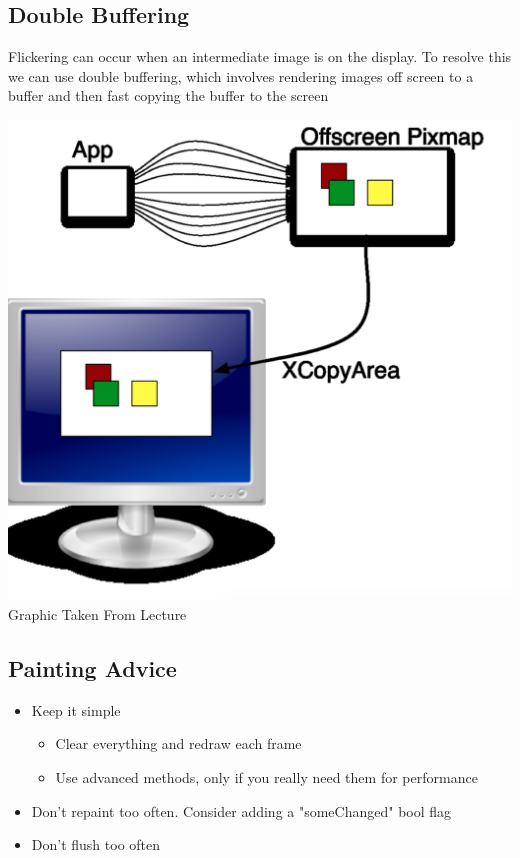 \documentclass[twoside]{article}
\begin{document}
\subsection{Double Buffering}
Flickering can occur when an intermediate image is on the display. To resolve this we can use double buffering, which involves rendering images off screen to a buffer and then fast copying the buffer to the screen 

\begin{center}
\includegraphics[scale=0.2]{9}\\
Graphic Taken From Lecture
\end{center}

\subsection{Painting Advice}
\begin{itemize}
\item Keep it simple
\begin{itemize}
\item Clear everything and redraw each frame
\item Use advanced methods, only if you really need them for performance
\end{itemize}
\item Don't repaint too often. Consider adding a "someChanged" bool flag
\item Don't flush too often
\end{itemize}
\end{document}
